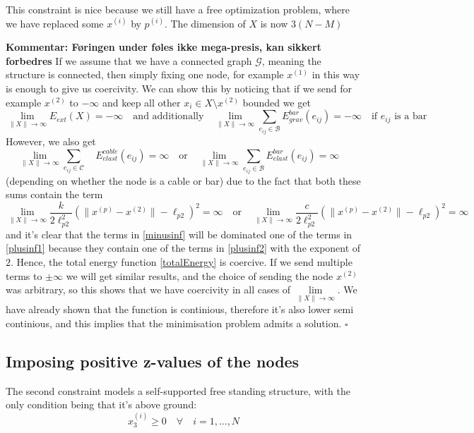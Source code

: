 \documentclass[11pt]{article}
\newcommand{\sumset}[1]{\sum\limits_{e_{ij} \in \mathcal{#1}}}
\newcommand{\ebe}{E^{bar}_{elast}(e_{ij})}
\newcommand{\ebg}{E^{bar}_{grav}(e_{ij})}
\newcommand{\ece}{E^{cable}_{elast}(e_{ij})}
\newcommand{\ee}{E_{ext}(X)}
\newcommand{\xinf}{\lim\limits_{\rVert X \lVert \to \infty}}
\begin{document}
This constraint is nice because we still have a free optimization problem, where we have replaced some $x^{(i)}$ by $p^{(i)}$. The dimension of $X$ is now $3(N-M)$

\textbf{Kommentar: Føringen under føles ikke mega-presis, kan sikkert forbedres}
If we assume that we have a connected graph $\mathcal{G}$, meaning the structure is connected, then simply fixing one node, for example $x^{(1)}$ in this way is enough to give us coercivity. We can show this by noticing that if we send for example $x^{(2)}$ to $-\infty$ and keep all other $x_i \in X \setminus x^{(2)}$ bounded we get
\begin{equation}
  \xinf \ee = -\infty
\quad\text{and additionally}\quad
\xinf \sumset{B} \ebg = -\infty \quad \text{if $e_{ij}$ is a bar}
\label{minusinf}
\end{equation}
However, we also get
\begin{equation}
     \xinf \sumset{C}\quad \ece = \infty \quad \text{or}\quad \xinf \sumset{B }\ebe = \infty \quad
     \label{plusinf1}
\end{equation} (depending on whether the node is a cable or bar)
due to the fact that both these sums contain the term \begin{equation}
 \xinf \frac{k}{2 \ell_{p2}^2}(\lVert x^{(p)} - x^{(2)} \rVert-\ell_{p2})^2 = \infty \quad \text{or} \quad \xinf \frac{c}{2 \ell_{p2}^2}(\lVert x^{(p)} - x^{(2)} \rVert-\ell_{p2})^2 = \infty
 \label{plusinf2}
\end{equation}
and it's clear that the terms in \eqref{minusinf} will be dominated one of the terms in \eqref{plusinf1} because they contain one of the terms in \eqref{plusinf2} with the exponent of $2$. Hence, the total energy function \eqref{totalEnergy} is coercive. If we send multiple terms to $\pm \infty$ we will get similar results, and the choice of sending the node $x^{(2)}$ was arbitrary, so this shows that we have coercivity in all cases of $\xinf$. We have already shown that the function is continious, therefore it's also lower semi continious, and this implies that the minimisation problem admits a solution. $\square$


\subsection{Imposing positive z-values of the nodes}
The second constraint models a self-supported free standing structure, with the only condition being that it's above ground:
\begin{equation}
    x_3^{(i)} \geq 0 \quad \forall \quad i = 1,...,N
\end{equation}
\end{document}
